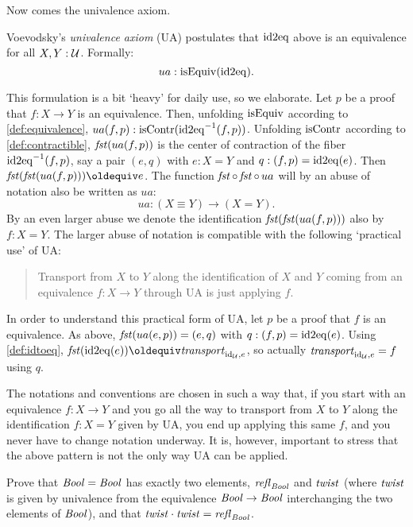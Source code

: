 Now comes the univalence axiom.

\begin{definition}\label{def:univalence}
Voevodsky's \emph{univalence axiom} (UA) postulates that 
$\mathrm{id2eq}$ above is an equivalence for all $X,Y:\mathcal{U}$.
Formally: \[ ua : \mathrm{isEquiv}(\mathrm{id2eq}).\]
\end{definition}

This formulation is a bit `heavy' for daily use,
so we elaborate.
Let $p$ be a proof that $f: X\to Y$ is an equivalence.
Then, unfolding $\mathrm{isEquiv}$ according to \cref{def:equivalence}, 
$ua(f,p): \mathrm{isContr}(\mathrm{id2eq}^{-1}(f,p))$.
Unfolding $\mathrm{isContr}$ according to \cref{def:contractible}, 
$\mathop{\mathit{fst}}(ua(f,p))$ is the center of contraction 
of the fiber $\mathrm{id2eq}^{-1}(f,p)$,
say a pair $(e,q)$ with $e:X=Y$ and $q: (f,p) = \mathrm{id2eq}(e)$.
Then $\fst(\fst(ua(f,p)))\jdeq e$. 
The function $\mathop{\mathit{fst}}\circ\mathop{\mathit{fst}}\circ {\,ua}$ will
by an abuse of notation also be written as $ua$:
\[
ua : (X \equiv Y) \to (X=Y). 
\]
By an even larger abuse we denote the identification
$\mathop{\mathit{fst}}(\mathop{\mathit{fst}}(ua(f,p)))$ also by $f: X=Y$. 
The larger abuse of notation is compatible with the following
`practical use' of UA: 
\begin{quote}
Transport from $X$ to $Y$ along the identification of $X$ and $Y$
coming from an equivalence $f : X\to Y$ through UA is just applying $f$.
\end{quote}
In order to understand this practical form of UA,
let $p$ be a proof that $f$ is an equivalence.
As above, $\mathop{\mathit{fst}}(ua(e,p)) = (e,q)$ with $q: (f,p) = \mathrm{id2eq}(e)$.
Using \cref{def:idtoeq}, $\fst(\idtoeq(e))\jdeq\trp_{\id_\UU, e}$,
so actually $\mathord{\mathit{transport}}_{\mathord{\mathrm{id}}_{\mathcal{U}}, e} =f$ using $q$.

The notations and conventions are chosen in such a way that,
if you start with an equivalence $f : X\to Y$ and you go all 
the way to transport from $X$ to $Y$ along the identification
$f: X=Y$ given by UA, you end up applying this same $f$, 
and you never have to change notation underway. 
It is, however, important to stress that the above pattern is
not the only way UA can be applied.

\begin{xca}\label{xca:C2}
Prove that $\mathop{\mathit{Bool}}=\mathop{\mathit{Bool}}$ has exactly two elements, 
$\mathop{{\it refl}_{\mathop{\mathit{Bool}}}}$ and $\mathit{twist}$ (where $\mathit{twist}$ is given by 
univalence from the equivalence $\mathop{\mathit{Bool}}\to\mathop{\mathit{Bool}}$ interchanging 
the two elements of $\mathop{\mathit{Bool}}$), and that $\mathit{twist}\cdot\mathit{twist}=\mathop{{\it refl}_{\mathop{\mathit{Bool}}}}$.
\end{xca}


